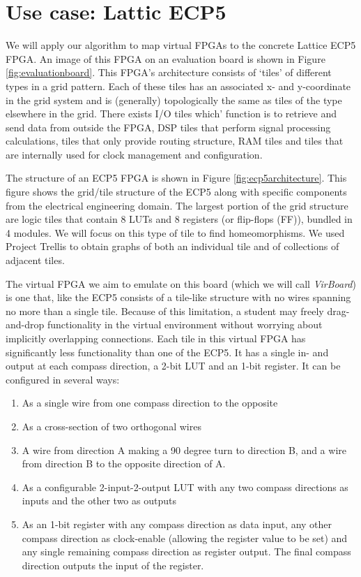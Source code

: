 \chapter{Use case: Lattic ECP5}
We will apply our algorithm to map virtual FPGAs to the concrete Lattice ECP5 FPGA. An image of this FPGA on an evaluation board is shown in Figure \ref{fig:evaluationboard}. This FPGA's architecture consists of `tiles' of different types in a grid pattern. Each of these tiles has an associated x- and y-coordinate in the grid system and is (generally) topologically the same as tiles of the type elsewhere in the grid. There exists I/O tiles which' function is to retrieve and send data from outside the FPGA, DSP tiles that perform signal processing calculations, tiles that only provide routing structure, RAM tiles and tiles that are internally used for clock management and configuration.

The structure of an ECP5 FPGA is shown in Figure \ref{fig:ecp5architecture}. This figure shows the grid/tile structure of the ECP5 along with specific components from the electrical engineering domain. The largest portion of the grid structure are logic tiles that contain 8 LUTs and 8 registers (or flip-flops (FF)), bundled in 4 modules. We will focus on this type of tile to find homeomorphisms. We used Project Trellis\cite{todo} to obtain graphs of both an individual tile and of collections of adjacent tiles.

The virtual FPGA we aim to emulate on this board (which we will call \textit{VirBoard}) is one that, like the ECP5 consists of a tile-like structure with no wires spanning no more than a single tile. Because of this limitation, a student may freely drag-and-drop functionality in the virtual environment without worrying about implicitly overlapping connections. Each tile in this virtual FPGA has significantly less functionality than one of the ECP5. It has a single in- and output at each compass direction, a 2-bit LUT and an 1-bit register. It can be configured in several ways:

\begin{enumerate}
\item As a single wire from one compass direction to the opposite
\item As a cross-section of two orthogonal wires
\item A wire from direction A making a 90 degree turn to direction B, and a wire from direction B to the opposite direction of A.
\item As a configurable 2-input-2-output LUT with any two compass directions as inputs and the other two as outputs
\item As an 1-bit register with any compass direction as data input, any other compass direction as clock-enable (allowing the register value to be set) and any single remaining compass direction as register output. The final compass direction outputs the input of the register.
\end{enumerate}

